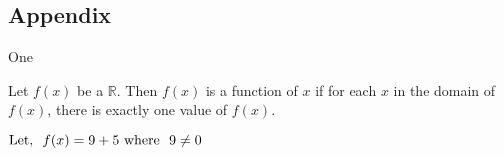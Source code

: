 \begin{appendix}
    \chapter{Appendix}
        One
        
    Let $f(x)$ be a $\mathbb{R}$. Then $f(x)$ is a function of $x$ if for each $x$ in the domain of $f(x)$, there is exactly one value of $f(x)$.
    
    \(\text{Let, \space}f(x)=9+5\text{\space where \space}9\neq 0\)
    
\end{appendix}